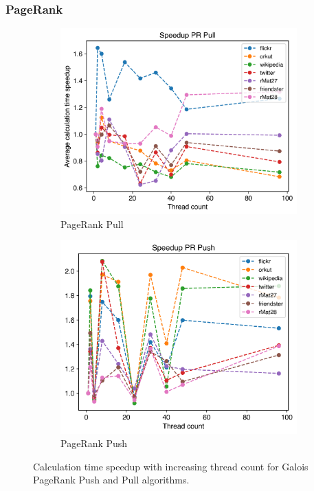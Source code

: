 \subsubsection{PageRank}
\begin{figure}
	\begin{subfigure}{\columnwidth}
		\includegraphics[width=\columnwidth]{../../plots/singleNodePRPullGaloisThreads.png}
		\caption{PageRank Pull}
		\label{fig:galoisSpeedupPRPull}
	\end{subfigure}
	\begin{subfigure}{\columnwidth}
		\includegraphics[width=\columnwidth]{../../plots/singleNodePRPushGaloisThreads.png}
		\caption{PageRank Push}
		\label{fig:galoisSpeedupPRPush}
	\end{subfigure}
	\caption{Calculation time speedup with increasing thread count for Galois PageRank Push and Pull algorithms.}
\end{figure}

